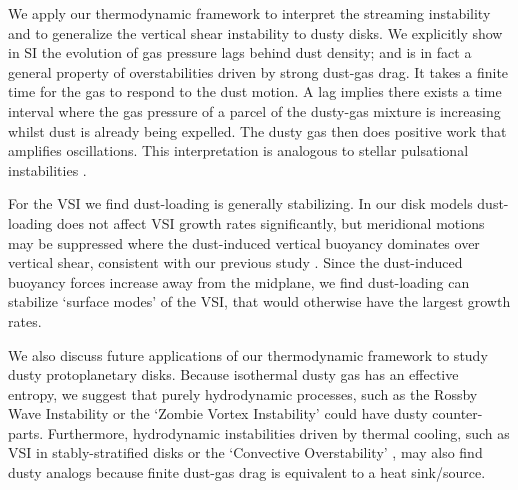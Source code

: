 

We  apply our thermodynamic framework to interpret
the streaming instability \citep[SI, ][]{youdin05a,jacquet11} and to generalize the vertical shear
instability \citep[VSI, ][]{nelson13,lin15} to dusty disks. We
explicitly show in SI the evolution of gas
pressure lags behind dust density; and is in fact a general property of 
overstabilities driven by strong dust-gas drag. 
It takes a finite time for the gas to respond to
the dust motion. A lag implies there exists a time interval where 
the gas pressure of a parcel of the dusty-gas mixture is increasing whilst dust is already being expelled.  
The dusty gas then does positive work that amplifies 
oscillations. This interpretation is analogous to stellar pulsational
instabilities \citep{cox67}. 

For the VSI we find dust-loading is generally stabilizing. In our disk models 
dust-loading does not affect VSI growth rates significantly, but
meridional motions may be suppressed where the dust-induced
vertical buoyancy dominates over vertical shear, consistent with our
previous study \citep{lin15}. Since the dust-induced buoyancy forces
increase away from the midplane, we find dust-loading can stabilize
`surface modes'  of the VSI, that would otherwise have the largest
growth rates.   

We also discuss future applications of our thermodynamic framework to 
study dusty protoplanetary disks. Because isothermal dusty gas has an
effective entropy, we suggest that purely hydrodynamic processes, such
as the Rossby Wave Instability \citep{li00} or the `Zombie Vortex
Instability' \citep{marcus15} could have dusty counter-parts.   
Furthermore, hydrodynamic instabilities driven by thermal cooling, such as VSI in
stably-stratified disks \citep{lin15} or the `Convective
Overstability' \citep{klahr14, lyra14},  may also find dusty analogs 
because finite dust-gas drag is equivalent to a heat sink/source. 


 
